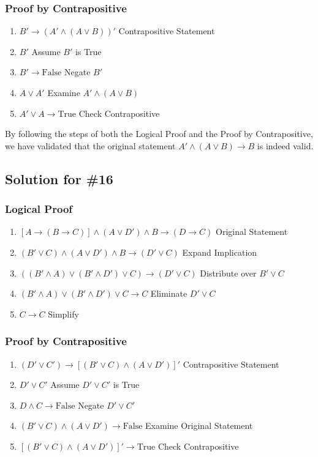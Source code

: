 \documentclass[12pt]{article}
\begin{document}
\subsubsection*{Proof by Contrapositive}
\begin{enumerate}
    \item \( B' \to (A' \land (A \lor B))' \) \hfill Contrapositive Statement
    \item \( B' \) \hfill Assume \( B' \) is True
    \item \( B' \to \text{False} \) \hfill Negate \( B' \)
    \item \( A \lor A' \) \hfill Examine \( A' \land (A \lor B) \)
    \item \( A' \lor A \to \text{True} \) \hfill Check Contrapositive
\end{enumerate}
By following the steps of both the Logical Proof and the Proof by Contrapositive, we have validated that the original statement \( A' \land (A \lor B) \to B \) is indeed valid.

\newpage
\subsection*{Solution for \#16}

\subsubsection*{Logical Proof}

\begin{enumerate}
    \item \( [A \to (B \to C)] \land (A \lor D') \land B \to (D \to C) \) \hfill Original Statement
    \item \( (B' \lor C) \land (A \lor D') \land B \to (D' \lor C) \) \hfill Expand Implication
    \item \( ((B' \land A) \lor (B' \land D') \lor C) \to (D' \lor C) \) \hfill Distribute over \( B' \lor C \)
    \item \( (B' \land A) \lor (B' \land D') \lor C \to C \) \hfill Eliminate \( D' \lor C \) 
    \item \( C \to C \) \hfill Simplify
\end{enumerate}

\subsubsection*{Proof by Contrapositive}

\begin{enumerate}
    \item \( (D' \lor C') \to [(B' \lor C) \land (A \lor D')]' \) \hfill Contrapositive Statement
    \item \( D' \lor C' \) \hfill Assume \( D' \lor C' \) is True
    \item \( D \land C \to \text{False} \) \hfill Negate \( D' \lor C' \)
    \item \( (B' \lor C) \land (A \lor D') \to \text{False} \) \hfill Examine Original Statement
    \item \( [(B' \lor C) \land (A \lor D')]' \to \text{True} \) \hfill Check Contrapositive
\end{enumerate}
\end{document}
